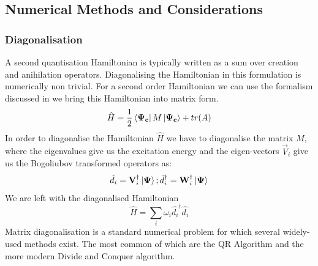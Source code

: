 \documentclass[Master]{subfiles}
\begin{document}
\subsection{Numerical Methods and Considerations}
\subsubsection{Diagonalisation}
A second quantisation Hamiltonian is typically written as a sum over creation and anihilation operators. Diagonalising the Hamiltonian in this formulation is numerically non trivial. For a second order Hamiltonian we can use the formalism discussed in  we bring this Hamiltonian into matrix form.  
$$
\hat{H} = \frac{1}{2}\bra{\mathbf{\Psi_c}}M\ket{\mathbf{\Psi_c}} + tr(A)
$$
In order to diagonalise the Hamiltonian $\hat{H}$ we have to diagonalise the matrix $M$, where the eigenvalues give us the excitation energy and the eigen-vectors $\vec{V}_i$ give us the Bogoliubov transformed operators as:
$$ \hat{d}_i = \mathbf{V}_i^{\dag}\ket{\mathbf{\Psi}} ; \hat{d}^{\dag}_i = \mathbf{W}_i^{\dag}\ket{\mathbf{\Psi}} $$
We are left with the diagonalised Hamiltonian 
$$ \hat{H} = \sum_i \omega_i \hat{d_i}^{\dag}\hat{d_i}$$
Matrix diagonalisation is a standard numerical problem for which several widely-used methods exist. The most common of which are 
the QR Algorithm and the more modern Divide and Conquer algorithm.
\end{document}
